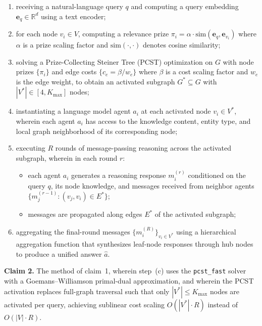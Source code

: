 \documentclass[a4paper,12pt]{article}
\begin{document}
\begin{enumerate}[label=(\alph*),nosep,leftmargin=2em]
\item receiving a natural-language query $q$ and computing a query embedding $\mathbf{e}_q \in \mathbb{R}^d$ using a text encoder;
\item for each node $v_i \in V$, computing a relevance prize $\pi_i = \alpha \cdot \mathrm{sim}(\mathbf{e}_q, \mathbf{e}_{v_i})$ where $\alpha$ is a prize scaling factor and $\mathrm{sim}(\cdot,\cdot)$ denotes cosine similarity;
\item solving a Prize-Collecting Steiner Tree (PCST) optimization on $G$ with node prizes $\{\pi_i\}$ and edge costs $\{c_e = \beta / w_e\}$ where $\beta$ is a cost scaling factor and $w_e$ is the edge weight, to obtain an activated subgraph $G^* \subseteq G$ with $|V^*| \in [4, K_{\max}]$ nodes;
\item instantiating a language model agent $a_i$ at each activated node $v_i \in V^*$, wherein each agent $a_i$ has access to the knowledge content, entity type, and local graph neighborhood of its corresponding node;
\item executing $R$ rounds of message-passing reasoning across the activated subgraph, wherein in each round $r$:
  \begin{itemize}[nosep,leftmargin=1.5em]
  \item each agent $a_i$ generates a reasoning response $m_i^{(r)}$ conditioned on the query $q$, its node knowledge, and messages received from neighbor agents $\{m_j^{(r-1)} : (v_j, v_i) \in E^*\}$;
  \item messages are propagated along edges $E^*$ of the activated subgraph;
  \end{itemize}
\item aggregating the final-round messages $\{m_i^{(R)}\}_{v_i \in V^*}$ using a hierarchical aggregation function that synthesizes leaf-node responses through hub nodes to produce a unified answer $\hat{a}$.
\end{enumerate}

\bigskip

\noindent\textbf{Claim 2.} The method of claim~1, wherein step~(c) uses the \texttt{pcst\_fast} solver with a Goemans--Williamson primal-dual approximation, and wherein the PCST activation replaces full-graph traversal such that only $|V^*| \leq K_{\max}$ nodes are activated per query, achieving sublinear cost scaling $O(|V^*| \cdot R)$ instead of $O(|V| \cdot R)$.

\bigskip
\end{document}
